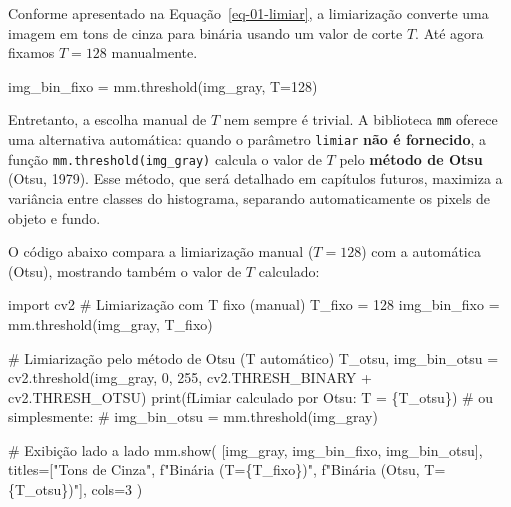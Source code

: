 \documentclass[
  portuguese,
  letterpaper,
  openany,
  oneside,
  12pt,
  a4paper]{book}
\newenvironment{Shaded}{\begin{snugshade}}{\end{snugshade}}
\newcommand{\BuiltInTok}[1]{\textcolor[rgb]{0.00,0.23,0.31}{#1}}
\newcommand{\CommentTok}[1]{\textcolor[rgb]{0.37,0.37,0.37}{#1}}
\newcommand{\DecValTok}[1]{\textcolor[rgb]{0.68,0.00,0.00}{#1}}
\newcommand{\ImportTok}[1]{\textcolor[rgb]{0.00,0.46,0.62}{#1}}
\newcommand{\NormalTok}[1]{\textcolor[rgb]{0.00,0.23,0.31}{#1}}
\newcommand{\OperatorTok}[1]{\textcolor[rgb]{0.37,0.37,0.37}{#1}}
\newcommand{\SpecialCharTok}[1]{\textcolor[rgb]{0.37,0.37,0.37}{#1}}
\newcommand{\SpecialStringTok}[1]{\textcolor[rgb]{0.13,0.47,0.30}{#1}}
\newcommand{\StringTok}[1]{\textcolor[rgb]{0.13,0.47,0.30}{#1}}
\begin{document}
Conforme apresentado na Equação~\ref{eq-01-limiar}, a limiarização
converte uma imagem em tons de cinza para binária usando um valor de
corte \(T\). Até agora fixamos \(T = 128\) manualmente.

\begin{Shaded}
\begin{Highlighting}[]
\NormalTok{img\_bin\_fixo }\OperatorTok{=}\NormalTok{ mm.threshold(img\_gray, T}\OperatorTok{=}\DecValTok{128}\NormalTok{)}
\end{Highlighting}
\end{Shaded}

Entretanto, a escolha manual de \(T\) nem sempre é trivial. A biblioteca
\texttt{mm} oferece uma alternativa automática: quando o parâmetro
\texttt{limiar} \textbf{não é fornecido}, a função
\texttt{mm.threshold(img\_gray)} calcula o valor de \(T\) pelo
\textbf{método de Otsu} (Otsu, 1979). Esse método, que será detalhado em
capítulos futuros, maximiza a variância entre classes do histograma,
separando automaticamente os pixels de objeto e fundo.

O código abaixo compara a limiarização manual (\(T=128\)) com a
automática (Otsu), mostrando também o valor de \(T\) calculado:

\begin{Shaded}
\begin{Highlighting}[]
\ImportTok{import}\NormalTok{ cv2}
\CommentTok{\# Limiarização com T fixo (manual)}
\NormalTok{T\_fixo }\OperatorTok{=} \DecValTok{128}
\NormalTok{img\_bin\_fixo }\OperatorTok{=}\NormalTok{ mm.threshold(img\_gray, T\_fixo)}

\CommentTok{\# Limiarização pelo método de Otsu (T automático)}
\NormalTok{T\_otsu, img\_bin\_otsu }\OperatorTok{=}\NormalTok{ cv2.threshold(img\_gray, }\DecValTok{0}\NormalTok{, }\DecValTok{255}\NormalTok{,}
\NormalTok{                                      cv2.THRESH\_BINARY }\OperatorTok{+}\NormalTok{ cv2.THRESH\_OTSU)}
\BuiltInTok{print}\NormalTok{(}\SpecialStringTok{f\textquotesingle{}Limiar calculado por Otsu: T = }\SpecialCharTok{\{}\NormalTok{T\_otsu}\SpecialCharTok{\}}\SpecialStringTok{\textquotesingle{}}\NormalTok{)}
\CommentTok{\# ou simplesmente:}
\CommentTok{\# img\_bin\_otsu = mm.threshold(img\_gray)}

\CommentTok{\# Exibição lado a lado}
\NormalTok{mm.show(}
\NormalTok{    [img\_gray, img\_bin\_fixo, img\_bin\_otsu], }
\NormalTok{    titles}\OperatorTok{=}\NormalTok{[}\StringTok{"Tons de Cinza"}\NormalTok{, }\SpecialStringTok{f"Binária (T=}\SpecialCharTok{\{}\NormalTok{T\_fixo}\SpecialCharTok{\}}\SpecialStringTok{)"}\NormalTok{, }\SpecialStringTok{f"Binária (Otsu, T=}\SpecialCharTok{\{}\NormalTok{T\_otsu}\SpecialCharTok{\}}\SpecialStringTok{)"}\NormalTok{],}
\NormalTok{    cols}\OperatorTok{=}\DecValTok{3}
\NormalTok{)}
\end{Highlighting}
\end{Shaded}
\end{document}
